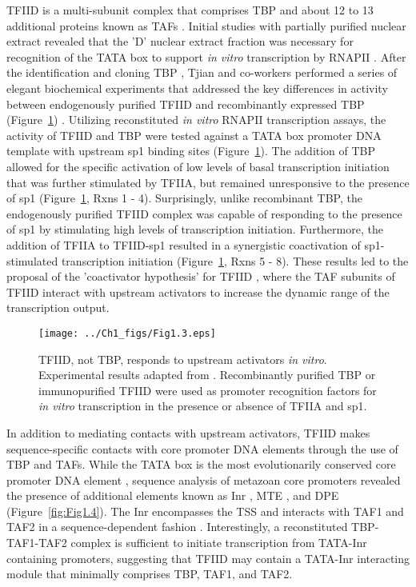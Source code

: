 TFIID is a multi-subunit complex that comprises TBP and about 12 to 13 additional proteins known as TAFs \cite{Burley_3049}. Initial studies with partially purified nuclear extract revealed that the 'D' nuclear extract fraction was necessary for recognition of the TATA box to support \emph{in vitro} transcription by RNAPII \cite{Matsui_3980}. After the identification and cloning TBP \cite{Buratowski_1988}, Tjian and co-workers performed a series of elegant biochemical experiments that addressed the key differences in activity between endogenously purified TFIID and recombinantly expressed TBP  (Figure~\ref{fig:Fig1.3})  \cite{Dynlacht_3551,Pugh_3586}. Utilizing reconstituted \emph{in vitro} RNAPII transcription assays, the activity of TFIID and TBP were tested against a TATA box promoter DNA template with upstream sp1 binding sites (Figure~\ref{fig:Fig1.3}). The addition of TBP allowed for the specific activation of low levels of basal transcription initiation that was further stimulated by TFIIA, but remained unresponsive to the presence of sp1 (Figure~\ref{fig:Fig1.3}, Rxns 1 - 4). Surprisingly, unlike recombinant TBP, the endogenously purified TFIID complex was capable of responding to the presence of sp1 by stimulating high levels of transcription initiation.  Furthermore, the addition of TFIIA to TFIID-sp1 resulted in a synergistic coactivation of sp1-stimulated transcription initiation (Figure~\ref{fig:Fig1.3}, Rxns 5 - 8). These results led to the proposal of the 'coactivator hypothesis' for TFIID \cite{Pugh_3586}, where the TAF subunits of TFIID interact with upstream activators to increase the dynamic range of the transcription output. \\
\begin{figure}
\centering
\texttt{[image: ../Ch1\_figs/Fig1.3.eps]}
\caption[TFIID, not TBP, responds to upstream activators \emph{in vitro}]{TFIID, not TBP, responds to upstream activators \emph{in vitro}. Experimental results adapted from \cite{Dynlacht_3551,Pugh_3586}. Recombinantly purified TBP or immunopurified TFIID were used as promoter recognition factors for \emph{in vitro} transcription in the presence or absence of TFIIA and sp1.} 
\label{fig:Fig1.3}
\end{figure}
\indent In addition to mediating contacts with upstream activators, TFIID makes sequence-specific contacts with core promoter DNA elements through the use of TBP and TAFs. While the TATA box is the most evolutionarily conserved core promoter DNA element \cite{Juven-Gershon_468}, sequence analysis of metazoan core promoters revealed the presence of additional elements known as Inr \cite{Smale_3697}, MTE \cite{Lim_1522}, and DPE \cite{Burke_3081} (Figure~\ref{fig:Fig1.4}). The Inr encompasses the TSS and interacts with TAF1 and TAF2 in a sequence-dependent fashion \cite{Chalkley_2339,Verrijzer_3120}. Interestingly, a reconstituted TBP-TAF1-TAF2 complex is sufficient to initiate transcription from TATA-Inr containing promoters, suggesting that TFIID may contain a TATA-Inr interacting module that minimally comprises TBP, TAF1, and TAF2. \\
